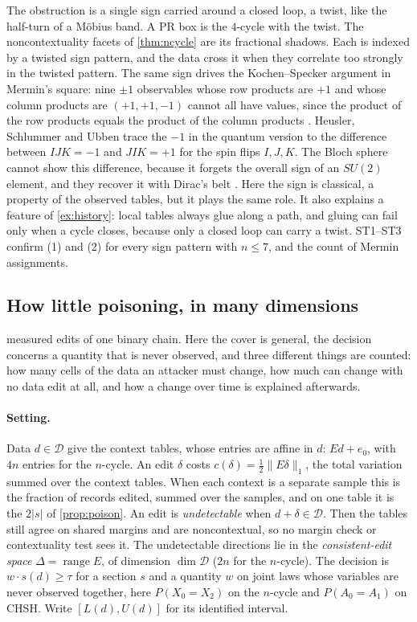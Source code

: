 \documentclass[11pt]{article}
\theoremstyle{definition}\newtheorem{definition}[theorem]{Definition}\newtheorem{remark}[theorem]{Remark}\newtheorem{example}[theorem]{Example}\newtheorem{problem}[theorem]{Open problem}\crefname{problem}{Problem}{Problems}
\begin{document}
The obstruction is a single sign carried around a closed loop, a twist, like the half-turn of a M\"obius band. A PR box is the $4$-cycle with the twist. The noncontextuality facets of \cref{thm:ncycle} are its fractional shadows. Each is indexed by a twisted sign pattern, and the data cross it when they correlate too strongly in the twisted pattern. The same sign drives the Kochen--Specker argument in Mermin's square: nine $\pm1$ observables whose row products are $+1$ and whose column products are $(+1,+1,-1)$ cannot all have values, since the product of the row products equals the product of the column products \cite{Mermin1990,Peres1990}. Heusler, Schlummer and Ubben trace the $-1$ in the quantum version to the difference between $IJK=-1$ and $JIK=+1$ for the spin flips $I,J,K$. The Bloch sphere cannot show this difference, because it forgets the overall sign of an $SU(2)$ element, and they recover it with Dirac's belt \cite{HeuslerSchlummerUbben2020}. Here the sign is classical, a property of the observed tables, but it plays the same role. It also explains a feature of \cref{ex:history}: local tables always glue along a path, and gluing can fail only when a cycle closes, because only a closed loop can carry a twist. ST1--ST3 confirm (1) and (2) for every sign pattern with $n\le7$, and the count of Mermin assignments.

\subsection{How little poisoning, in many dimensions}\label{sec:poisondim}
 measured edits of one binary chain. Here the cover is general, the decision concerns a quantity that is never observed, and three different things are counted: how many cells of the data an attacker must change, how much can change with no data edit at all, and how a change over time is explained afterwards.

\paragraph{Setting.} Data $d\in\mathcal D$ give the context tables, whose entries are affine in $d$: $Ed+e_0$, with $4n$ entries for the $n$-cycle. An edit $\delta$ costs $c(\delta)=\tfrac12\|E\delta\|_1$, the total variation summed over the context tables. When each context is a separate sample this is the fraction of records edited, summed over the samples, and on one table it is the $2|s|$ of \cref{prop:poison}. An edit is \emph{undetectable} when $d+\delta\in\mathcal D$. Then the tables still agree on shared margins and are noncontextual, so no margin check or contextuality test sees it. The undetectable directions lie in the \emph{consistent-edit space} $\Delta=\operatorname{range}E$, of dimension $\dim\mathcal D$ ($2n$ for the $n$-cycle). The decision is $w\cdot s(d)\ge\tau$ for a section $s$ and a quantity $w$ on joint laws whose variables are never observed together, here $P(X_0=X_2)$ on the $n$-cycle and $P(A_0=A_1)$ on CHSH. Write $[L(d),U(d)]$ for its identified interval.
\end{document}

